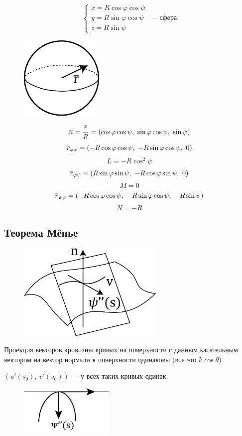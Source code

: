 \documentclass[main]{subfiles}
\begin{document}
	\begin{Example}
		\[\begin{cases}
			x = R \cos \varphi \cos \psi\\
			y = R \sin \varphi \cos \psi\\
			z = R \sin \psi
		\end{cases} \text{ --- сфера}\]
		\begin{figure}[H]
			\centering
			\includegraphics[width=4cm]{pics/7_6.png}
		\end{figure}
		\[\overline{n} = \dfrac{\overline{r}}{R} = (\cos \varphi \cos \psi,\ \sin \varphi \cos \psi,\ \sin \psi)\]
		\[\overline{r}_{\varphi \varphi} = (-R \cos \varphi \cos \psi,\ -R \sin \varphi \cos \psi,\ 0)\]
		\[L = -R \cos^2 \psi\]
		\[\overline{r}_{\varphi \psi} = (R \sin \varphi \sin \psi,\ -R \cos \varphi \sin \psi,\ 0)\]
		\[M = 0\]
		\[\overline{r}_{\psi \psi} = (-R \cos \varphi \cos \psi,\ -R \sin \varphi \cos \psi,\ -R \sin \psi)\]
		\[N = -R\]
	\end{Example}

	\subsection{Теорема Мёнье}
	\begin{figure}[H]
		\centering
		\includegraphics[width=7cm]{pics/7_7.png}
	\end{figure}
	\begin{theorem}[Мёнье?]
		Проекция векторов кривизны кривых на поверхности с данным касательным вектором на вектор нормали к поверхности одинаковы (все это $k \cos \theta$)
	\end{theorem}
	$(u'(s_0),\ v'(s_0)) \text{ --- у всех таких кривых одинак.}$
	\begin{figure}[H]
		\centering
		\includegraphics[width=4.5cm]{pics/7_8.png}
	\end{figure}
\end{document}

